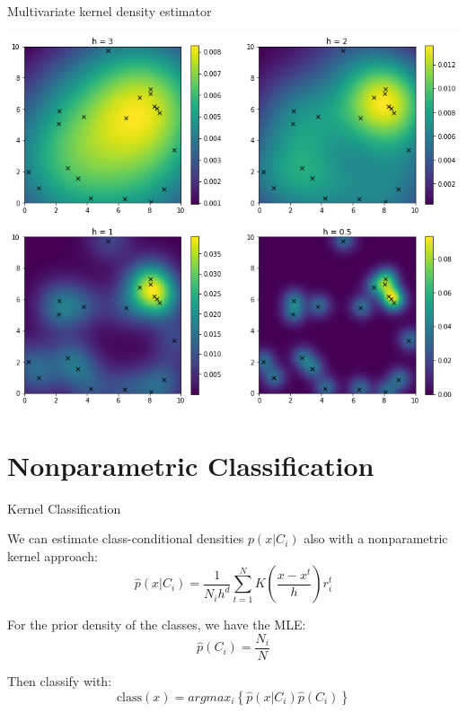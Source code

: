 \documentclass{beamer}
\begin{document}
\begin{frame}[fragile]{Multivariate kernel density estimator}
  \begin{center}
  \includegraphics[height=0.9\textheight]{images/multidddd.png}
  \end{center}
\end{frame}

\section{Nonparametric Classification}
\begin{frame}[fragile]{Kernel Classification}
  

We can estimate class-conditional densities $ p(x|C_{i})$ also with a nonparametric kernel approach:
	\begin{equation}
		\hat p(x|C_{i})=\frac{1}{N_{i}h^{d}}\sum^{N}_{t=1}K\left(\frac{x-x^{t}}{h}\right)r^{t}_{i}
	\end{equation} 	

For the prior density of the classes, we have the MLE:
\begin{equation}
  \hat p(C_i) = \frac{N_i}{N} 
\end{equation}

Then classify with:
\begin{equation}
  \text{class}(x) = argmax_i \left \{\hat p(x|C_i)\hat p(C_i) \right \}
\end{equation}
		
\end{frame}	
\end{document}

